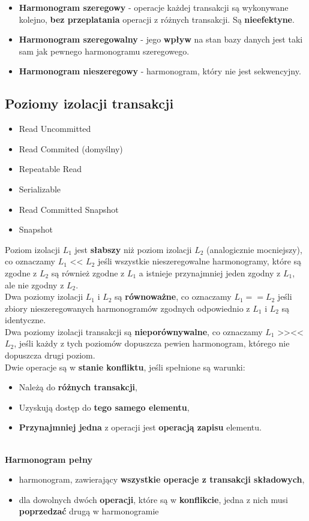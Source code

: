 \documentclass[a4paper]{article}
\begin{document}
\begin{itemize}
    \item \textbf{Harmonogram szeregowy} - operacje każdej transakcji są wykonywane kolejno, \textbf{bez przeplatania} operacji z różnych transakcji. Są \textbf{nieefektyne}.
    \item \textbf{Harmonogram szeregowalny} - jego \textbf{wpływ} na stan bazy danych jest taki sam jak pewnego harmonogramu szeregowego.
    \item \textbf{Harmonogram nieszeregowy} - harmonogram, który nie jest sekwencyjny.
\end{itemize}

\subsection{Poziomy izolacji transakcji}
\begin{itemize}
    \item Read Uncommitted
    \item Read Commited (domyślny)
    \item Repeatable Read
    \item Serializable
    \item Read Committed Snapshot
    \item Snapshot
\end{itemize}
Poziom izolacji $L_1$ jest \textbf{słabszy} niż poziom izolacji $L_2$ (analogicznie mocniejszy), co oznaczamy $L_1$ << $L_2$ jeśli wszystkie nieszeregowalne harmonogramy, które są zgodne z $L_2$ są również zgodne z $L_1$ a istnieje przynajmniej jeden zgodny z $L_1$, ale nie zgodny z $L_2$.\\
Dwa poziomy izolacji $L_1$ i $L_2$ są \textbf{równoważne}, co oznaczamy $L_1 == L_2$ jeśli zbiory nieszeregowanych harmonogramów zgodnych odpowiednio z $L_1$ i $L_2$ są identyczne.\\
Dwa poziomy izolacji transakcji są \textbf{nieporównywalne}, co oznaczamy $L_1$ >><< $L_2$, jeśli każdy z tych poziomów dopuszcza pewien harmonogram, którego nie dopuszcza drugi poziom.\\

Dwie operacje są w \textbf{stanie konfliktu}, jeśli spełnione są warunki:
\begin{itemize}
    \item Należą do \textbf{różnych transakcji}, 
    \item Uzyskują dostęp do \textbf{tego samego elementu},
    \item \textbf{Przynajmniej jedna} z operacji jest \textbf{operacją zapisu} elementu.
\end{itemize}
\hfill \\
\textbf{Harmonogram pełny}
\begin{itemize}
    \item harmonogram, zawierający \textbf{wszystkie operacje z transakcji składowych},
    \item dla dowolnych dwóch \textbf{operacji}, które są w \textbf{konflikcie}, jedna z nich musi \textbf{poprzedzać} drugą w harmonogramie
\end{itemize}
\end{document}
